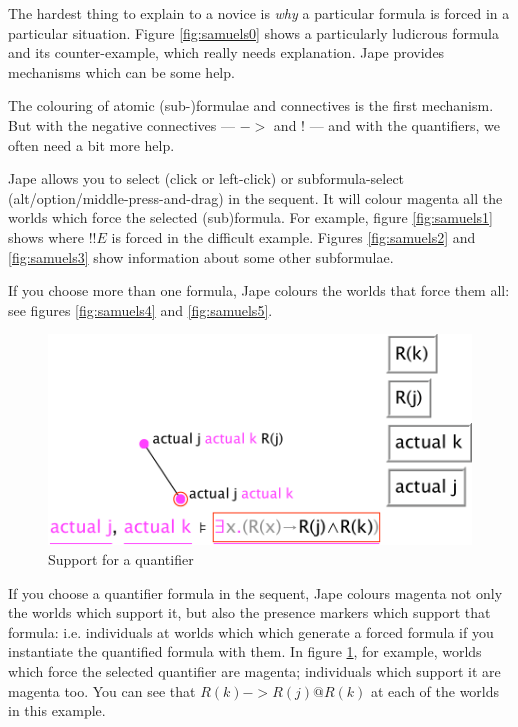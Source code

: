 \documentclass[11pt]{book}
\newcommand{\figref}[1]{figure \ref{fig:#1}}
\newcommand{\Figref}[1]{Figure \ref{fig:#1}}
\begin{document}
The hardest thing to explain to a novice is \emph{why} a particular formula is forced in a particular situation. \Figref{samuels0} shows a particularly ludicrous formula and its counter-example, which really needs explanation. Jape provides mechanisms which can be some help.

The colouring of atomic (sub-)formulae and connectives is the first mechanism. But with the negative connectives --- $->$ and $!$ --- and with the quantifiers, we often need a bit more help.

Jape allows you to select (click or left-click) or subformula-select (alt/option/middle-press-and-drag) in the sequent. It will colour magenta all the worlds which force the selected (sub)formula. For example, \figref{samuels1} shows where $!!E$ is forced in the difficult example. Figures \ref{fig:samuels2} and \ref{fig:samuels3} show information about some other subformulae.

If you choose more than one formula, Jape colours the worlds that force them all: see figures \ref{fig:samuels4} and \ref{fig:samuels5}.

\begin{figure}
\centering
\includegraphics[scale=0.5]{pics/quantifiers1}
\caption{Support for a quantifier}
\label{fig:quantifiers1}
\end{figure}

If you choose a quantifier formula in the sequent, Jape colours magenta not only the worlds which support it, but also the presence markers which support that formula: i.e. individuals at worlds which which generate a forced formula if you instantiate the quantified formula with them. In \figref{quantifiers1}, for example, worlds which force the selected quantifier are magenta; individuals which support it are magenta too. You can see that $R(k)->R(j)@R(k)$ at each of the worlds in this example.
\end{document}
